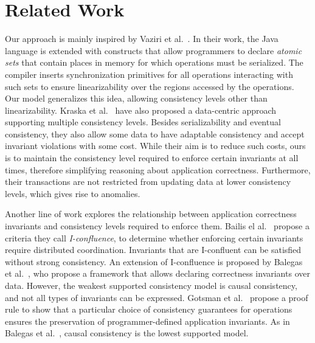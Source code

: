 \documentclass[preprint,numbers]{sigplanconf}
\begin{document}
\section{Related Work}
\label{sec:relatedwork}
Our approach is mainly inspired by Vaziri et al.~\cite{dolby2012data}. In their work, 
the Java language is extended with constructs that allow programmers to declare
\emph{atomic sets} that contain places in memory for which operations must be
serialized. The compiler inserts synchronization primitives for all
operations interacting with such sets to ensure linearizability over the
regions accessed by the operations.
Our model generalizes this idea, allowing consistency
levels other than linearizability.
Kraska et al.~\cite{kraska2009consistency} have also proposed a data-centric
approach supporting multiple consistency levels. Besides 
serializability and eventual consistency, they also allow some data to have adaptable consistency and
accept invariant violations with some cost. While their aim is to reduce
such costs, ours is to maintain the consistency level required to enforce
certain invariants at all times, therefore simplifying reasoning about 
application
correctness. Furthermore, their transactions are not restricted from updating
data at lower consistency levels, which gives rise to anomalies.

Another line of work explores the relationship between
application correctness invariants and consistency levels required to enforce them.
Bailis el al.~\cite{bailis2014coordination} propose a criteria they call
\emph{I-confluence}, to determine whether enforcing certain invariants require distributed
coordination. Invariants that are I-confluent can be satisfied without strong
consistency. 
An extension of I-confluence is proposed by Balegas et
al.~\cite{balegas2015putting}, who propose a framework that allows declaring
correctness invariants over data. However, the weakest supported consistency
model is causal consistency, and not all types of invariants can be
expressed.
Gotsman et al.~\cite{gotsman2016cause} propose a proof rule
 to show that a 
particular choice of consistency guarantees for operations
ensures the preservation of programmer-defined application invariants. As in
Balegas et al.~\cite{balegas2015putting}, causal consistency is the lowest supported model.
\end{document}

